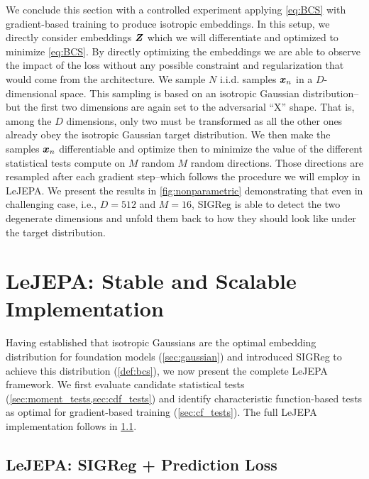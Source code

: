 We conclude this section with a controlled experiment applying \eqref{eq:BCS} with gradient-based training to produce isotropic embeddings. In this setup, we directly consider embeddings ${\bm{Z}}$ which we will differentiate and optimized to minimize \eqref{eq:BCS}. By directly optimizing the embeddings we are able to observe the impact of the loss without any possible constraint and regularization that would come from the architecture.
We sample $N$ i.i.d. samples ${\bm{x}}_{n}$ in a $D$-dimensional space. This sampling is based on an isotropic Gaussian distribution--but the first two dimensions are again set to the adversarial ``X'' shape. That is, among the $D$ dimensions, only two must be transformed as all the other ones already obey the isotropic Gaussian target distribution. We then make the samples ${\bm{x}}_{n}$ differentiable and optimize then to minimize the value of the different statistical tests compute on $M$ random $M$ random directions. Those directions are resampled after each gradient step--which follows the procedure we will employ in LeJEPA. We present the results in \cref{fig:nonparametric} demonstrating that even in challenging case, i.e., $D=512$ and $M=16$, SIGReg is able to detect the two degenerate dimensions and unfold them back to how they should look like under the target distribution.






\section{LeJEPA: Stable and Scalable Implementation}
\label{sec:lejepa}


Having established that isotropic Gaussians are the optimal embedding distribution 
for foundation models (\cref{sec:gaussian}) and introduced SIGReg to achieve this 
distribution (\cref{def:bcs}), we now present the complete LeJEPA framework. We 
first evaluate candidate statistical tests (\cref{sec:moment_tests,sec:cdf_tests}) 
and identify characteristic function-based tests as optimal for gradient-based 
training (\cref{sec:cf_tests}). The full LeJEPA implementation follows in 
\cref{sec:lejepa_implementation}.







\subsection{LeJEPA: SIGReg + Prediction Loss}
\label{sec:lejepa_implementation}







